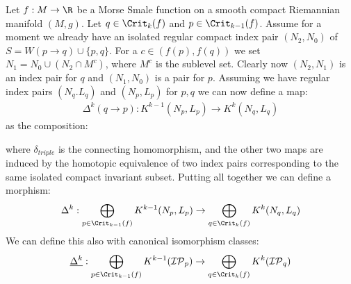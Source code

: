 \begin{example}
	Let $f:M\to \R$ be a Morse Smale function on a smooth compact Riemannian manifold $(M,g)$. Let $q\in \Crit_k(f)$ and $p\in \Crit_{k-1}(f)$. Assume for a moment we already have an isolated regular compact index pair $(N_2,N_0)$ of $S=W(p\to q)\cup\{p,q\}$. 
	For a $c\in (f(p),f(q))$ we set $N_1=N_0\cup (N_2 \cap M^c)$, where $M^c$ is the sublevel set. Clearly now $(N_2,N_1)$ is an index pair for $q$ and $(N_1,N_0)$ is a pair for $p$. Assuming we have regular index pairs $(N_q.L_q)$ and $(N_p,L_p)$ for $p,q$ we can now define a map:
	\begin{align*}
		\Delta^k(q \to p):K^{k-1}(N_p,L_p) \to  K^k(N_q,L_q) 
	\end{align*} as the composition:
	\begin{center}
	\end{center} where $\delta_{triple}$ is the connecting homomorphism, and the other two maps are induced by the homotopic equivalence of two index pairs corresponding to the same isolated compact invariant subset. Putting all together we can define a morphism:
	\begin{align}\label{equation: definition of boundary operator for filtrations}
		\Delta^k:\bigoplus_{p\in \Crit_{k-1}(f)}K^{k-1}(N_p,L_p) \to \bigoplus_{q\in \Crit_k(f)}K^k(N_q,L_q)
	\end{align}
	We can define this also with canonical isomorphism classes:
	\begin{equation*}
		\underline{\Delta^k}:\bigoplus\limits_{p\in \Crit_{k-1}(f)}K^{k-1}(\mathcal{IP}_p)\to \bigoplus\limits_{q\in \Crit_{k}(f)}K^{k}(\mathcal{IP}_q)
	\end{equation*} 
\end{example}






